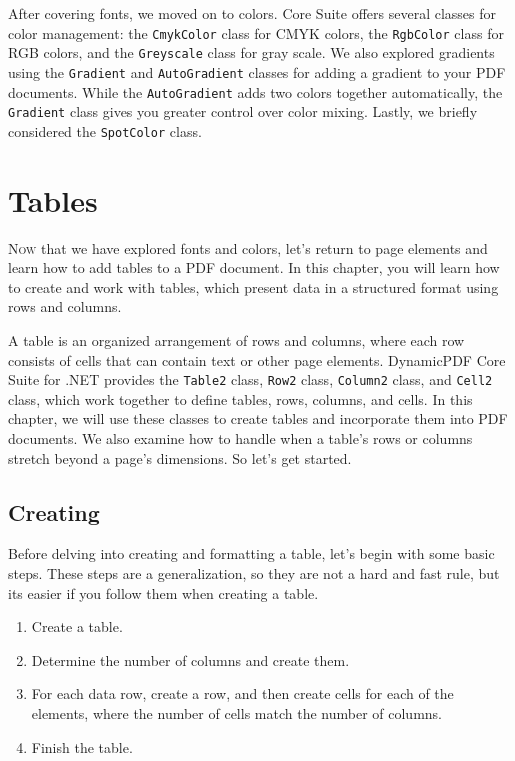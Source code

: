 \documentclass[american]{tufte-book}
\numberwithin{equation}{section}
\numberwithin{figure}{section}
\def\color#1{}%
\begin{document}
{After covering fonts, we moved on to colors. Core Suite offers several classes for color management: the \texttt{CmykColor} class for CMYK colors, the \texttt{RgbColor}
class for RGB colors, and the \texttt{Greyscale} class for gray scale.
We also explored gradients using the \texttt{Gradient} and \texttt{AutoGradient}
classes for adding a gradient to your PDF documents. While the \texttt{AutoGradient}
adds two colors together automatically, the \texttt{Gradient} class gives you greater control over color mixing. Lastly, we briefly considered the \texttt{SpotColor} class.


\color{white}
\chapter{Tables}\label{chap:Tables}
\color{black}
\BgThispage
\vspace{8.00em}
\lettrine[lines=2,lhang=0.1]{N}{ow} that we have explored fonts and colors, let's return to page elements and learn how to add tables to a PDF document. In this chapter, you will learn how to create and work with tables, which present data in a structured format using rows and columns.

A table is an organized arrangement of rows and columns, where each row consists of cells that can contain text or other page elements. DynamicPDF Core Suite for .NET provides the
\texttt{Table2} class, \texttt{Row2} class, \texttt{Column2} class,
and \texttt{Cell2} class, which work together to define tables, rows, columns, and cells. In this chapter, we will use these classes to create tables and incorporate them into PDF documents. We also examine how to handle when a table's rows or columns stretch beyond a page's dimensions.  So let's get started.

\section{Creating}

Before delving into creating and formatting a table, let's begin with
some basic steps. These steps are a generalization, so they are not
a hard and fast rule, but its easier if you follow them when creating
a table.
\begin{enumerate}
\item Create a table.
\item Determine the number of columns and create them.
\item For each data row, create a row, and then create cells for each of
the elements, where the number of cells match the number of columns.
\item Finish the table.
\end{enumerate}

}
\end{document}
